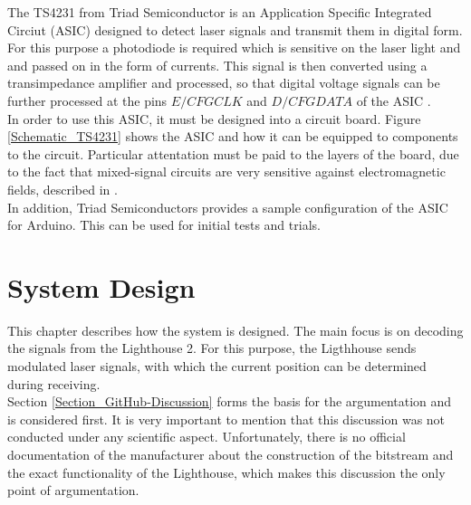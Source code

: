 \documentclass[a4paper,twoside, openright,12pt]{report}
\begin{document}
The TS4231 from Triad Semiconductor is an Application Specific Integrated Circiut (ASIC) designed to detect laser signals and transmit them in digital form. For this purpose a photodiode is required which is sensitive on the laser light and and passed on in the form of currents. This signal is then converted using a transimpedance amplifier and processed, so that digital voltage signals can be further processed at the pins $E/CFGCLK$ and $D/CFGDATA$ of the ASIC \cite{TriadSemiconductor.2016b}. \\
In order to use this ASIC, it must be designed into a circuit board. Figure \ref{Schematic_TS4231} shows the ASIC and how it can be equipped to components to the circuit. Particular attentation must be paid to the layers of the board, due to the fact that mixed-signal circuits are very sensitive against electromagnetic fields, described in \cite{TriadSemiconductor.2016}. \\
In addition, Triad Semiconductors provides a sample configuration of the ASIC for Arduino. \cite{TriadSemiconductor.2016} This can be used for initial tests and trials.


\chapter{System Design}
\label{Chapter_System-Design}
This chapter describes how the system is designed. The main focus is on decoding the signals from the Lighthouse 2. For this purpose, the Ligthhouse sends modulated laser signals, with which the current position can be determined during receiving. \\
Section \ref{Section_GitHub-Discussion} forms the basis for the argumentation and is considered first. It is very important to mention that this discussion was not conducted under any scientific aspect. Unfortunately, there is no official documentation of the manufacturer about the construction of the bitstream and the exact functionality of the Lighthouse, which makes this discussion the only point of argumentation.
\end{document}
